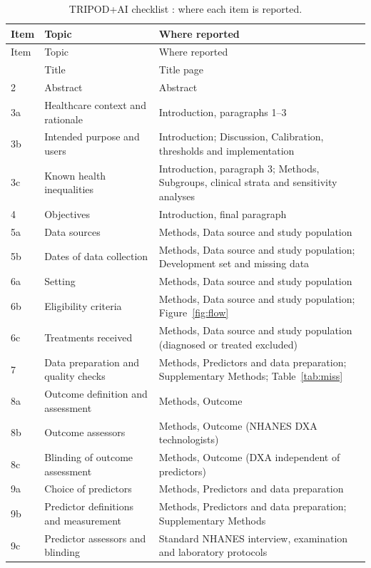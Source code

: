 \documentclass[11pt,a4paper]{article}
\begin{document}
\small
\begin{longtable}{p{1.0cm}p{6.4cm}p{7.1cm}}
\caption{TRIPOD+AI checklist \cite{collins2024}: where each item is reported.}\label{tab:tripod}\\
\toprule
Item & Topic & Where reported \\
\midrule
\endfirsthead
\toprule
Item & Topic & Where reported \\
\midrule
\endhead
\bottomrule
\endfoot
1 & Title & Title page \\
2 & Abstract & Abstract \\
3a & Healthcare context and rationale & Introduction, paragraphs 1--3 \\
3b & Intended purpose and users & Introduction; Discussion, Calibration, thresholds and implementation \\
3c & Known health inequalities & Introduction, paragraph 3; Methods, Subgroups, clinical strata and sensitivity analyses \\
4 & Objectives & Introduction, final paragraph \\
5a & Data sources & Methods, Data source and study population \\
5b & Dates of data collection & Methods, Data source and study population; Development set and missing data \\
6a & Setting & Methods, Data source and study population \\
6b & Eligibility criteria & Methods, Data source and study population; Figure~\ref{fig:flow} \\
6c & Treatments received & Methods, Data source and study population (diagnosed or treated excluded) \\
7 & Data preparation and quality checks & Methods, Predictors and data preparation; Supplementary Methods; Table~\ref{tab:miss} \\
8a & Outcome definition and assessment & Methods, Outcome \\
8b & Outcome assessors & Methods, Outcome (NHANES DXA technologists) \\
8c & Blinding of outcome assessment & Methods, Outcome (DXA independent of predictors) \\
9a & Choice of predictors & Methods, Predictors and data preparation \\
9b & Predictor definitions and measurement & Methods, Predictors and data preparation; Supplementary Methods \\
9c & Predictor assessors and blinding & Standard NHANES interview, examination and laboratory protocols \\

\end{longtable}
\end{document}
